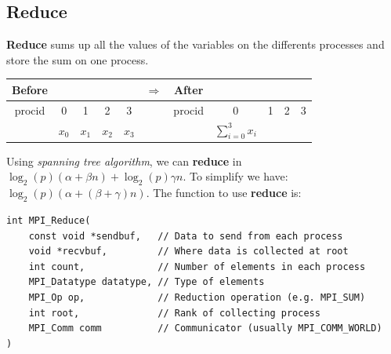 \documentclass[12pt, openany]{report}
\theoremstyle{definition}
\begin{document}
\subsection{Reduce}
\textbf{Reduce} sums up all the values of the variables on the differents processes and store the sum on one process.\\
\begin{center}
	\begin{tabular}{ccccc|c|ccccc}
		Before &&&&& $\Longrightarrow$ &After&&&&\\
		\hline
		procid & 0 & 1 & 2 & 3 & & procid & 0 & 1 & 2 & 3\\
		\hline
		& $x_0$ & $x_1$ & $x_2$ & $x_3$ && & $\displaystyle \sum_{i=0}^{3} x_i$ &&&\\
		\hline
	\end{tabular}
\end{center}
Using \textit{spanning tree algorithm}, we can \textbf{reduce} in $\log_2(p)(\alpha + \beta n) + \log_2(p) \gamma n$. To simplify we have: $\log_2(p)(\alpha + (\beta + \gamma) n)$. The function to use \textbf{reduce} is:
\begin{lstlisting}[style=CppStyle]
int MPI_Reduce(
    const void *sendbuf,   // Data to send from each process
    void *recvbuf,         // Where data is collected at root 
    int count,             // Number of elements in each process
    MPI_Datatype datatype, // Type of elements
    MPI_Op op,             // Reduction operation (e.g. MPI_SUM)
    int root,              // Rank of collecting process
    MPI_Comm comm          // Communicator (usually MPI_COMM_WORLD)
)
\end{lstlisting}
\end{document}
